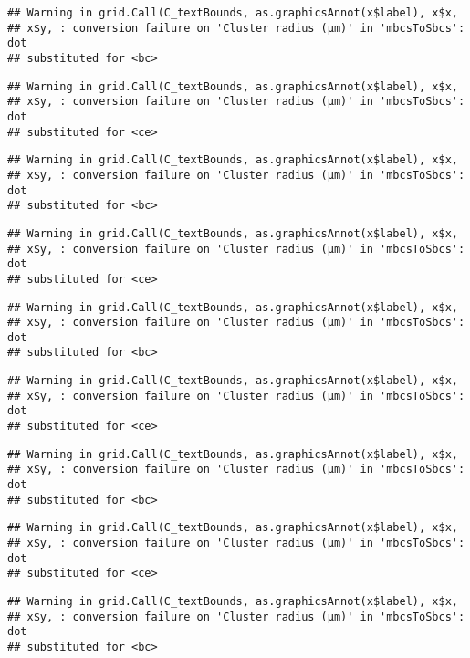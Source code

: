 \documentclass[]{article}
\begin{document}
\begin{verbatim}
## Warning in grid.Call(C_textBounds, as.graphicsAnnot(x$label), x$x,
## x$y, : conversion failure on 'Cluster radius (μm)' in 'mbcsToSbcs': dot
## substituted for <bc>
\end{verbatim}

\begin{verbatim}
## Warning in grid.Call(C_textBounds, as.graphicsAnnot(x$label), x$x,
## x$y, : conversion failure on 'Cluster radius (μm)' in 'mbcsToSbcs': dot
## substituted for <ce>
\end{verbatim}

\begin{verbatim}
## Warning in grid.Call(C_textBounds, as.graphicsAnnot(x$label), x$x,
## x$y, : conversion failure on 'Cluster radius (μm)' in 'mbcsToSbcs': dot
## substituted for <bc>
\end{verbatim}

\begin{verbatim}
## Warning in grid.Call(C_textBounds, as.graphicsAnnot(x$label), x$x,
## x$y, : conversion failure on 'Cluster radius (μm)' in 'mbcsToSbcs': dot
## substituted for <ce>
\end{verbatim}

\begin{verbatim}
## Warning in grid.Call(C_textBounds, as.graphicsAnnot(x$label), x$x,
## x$y, : conversion failure on 'Cluster radius (μm)' in 'mbcsToSbcs': dot
## substituted for <bc>
\end{verbatim}

\begin{verbatim}
## Warning in grid.Call(C_textBounds, as.graphicsAnnot(x$label), x$x,
## x$y, : conversion failure on 'Cluster radius (μm)' in 'mbcsToSbcs': dot
## substituted for <ce>
\end{verbatim}

\begin{verbatim}
## Warning in grid.Call(C_textBounds, as.graphicsAnnot(x$label), x$x,
## x$y, : conversion failure on 'Cluster radius (μm)' in 'mbcsToSbcs': dot
## substituted for <bc>
\end{verbatim}

\begin{verbatim}
## Warning in grid.Call(C_textBounds, as.graphicsAnnot(x$label), x$x,
## x$y, : conversion failure on 'Cluster radius (μm)' in 'mbcsToSbcs': dot
## substituted for <ce>
\end{verbatim}

\begin{verbatim}
## Warning in grid.Call(C_textBounds, as.graphicsAnnot(x$label), x$x,
## x$y, : conversion failure on 'Cluster radius (μm)' in 'mbcsToSbcs': dot
## substituted for <bc>
\end{verbatim}
\end{document}
